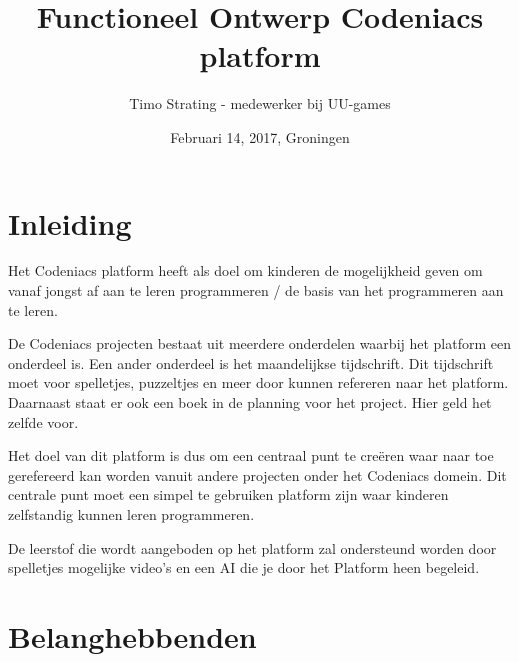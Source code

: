 \documentclass[]{report}
\title{Functioneel Ontwerp Codeniacs platform}
\author{Timo Strating - medewerker bij UU-games}
\date{Februari 14, 2017, Groningen}
\begin{document}
\maketitle

\tableofcontents
\newpage






\chapter{Inleiding}

Het Codeniacs platform heeft als doel om kinderen de mogelijkheid geven om vanaf jongst af aan te leren programmeren / de basis van het programmeren aan te leren.

De Codeniacs projecten bestaat uit meerdere onderdelen waarbij het platform een onderdeel is. Een ander onderdeel is het maandelijkse tijdschrift. Dit tijdschrift moet voor spelletjes, puzzeltjes en meer door kunnen refereren naar het platform. Daarnaast staat er ook een boek in de planning voor het project. Hier geld het zelfde voor.

Het doel van dit platform is dus om een centraal punt te creëren waar naar toe gerefereerd kan worden vanuit andere projecten onder het Codeniacs domein. Dit centrale punt moet een simpel te gebruiken platform zijn waar kinderen zelfstandig kunnen leren programmeren.

De leerstof die wordt aangeboden op het platform zal ondersteund worden door spelletjes mogelijke video’s en een AI die je door het Platform heen begeleid.






\chapter{Belanghebbenden}
\end{document}
